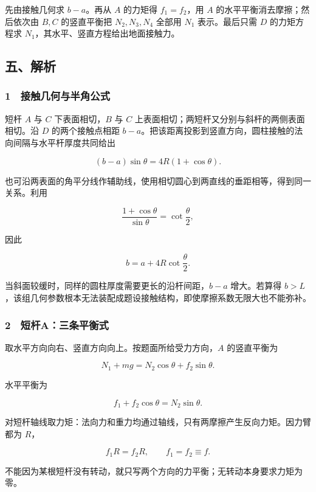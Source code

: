 \documentclass[12pt,a4paper,fontset=fandol]{ctexart}
\begin{document}
先由接触几何求 \(b-a\)。再从 \(A\) 的力矩得 \(f_1=f_2\)，用 \(A\)
的水平平衡消去摩擦；然后依次由 \(B,C\) 的竖直平衡把 \(N_2,N_3,N_4\)
全部用 \(N_1\) 表示。最后只需 \(D\) 的力矩方程求
\(N_1\)，其水平、竖直方程给出地面接触力。

\subsection{五、解析}\label{ux4e94ux89e3ux6790-3}

\subsubsection{1　接触几何与半角公式}\label{ux63a5ux89e6ux51e0ux4f55ux4e0eux534aux89d2ux516cux5f0f}

短杆 \(A\) 与 \(C\) 下表面相切，\(B\) 与 \(C\)
上表面相切；两短杆又分别与斜杆的两侧表面相切。沿 \(D\) 的两个接触点相距
\(b-a\)。把该距离投影到竖直方向，圆柱接触的法向间隔与水平杆厚度共同给出

\[ (b-a)\sin\theta=4R(1+\cos\theta).\]

也可沿两表面的角平分线作辅助线，使用相切圆心到两直线的垂距相等，得到同一关系。利用

\[\frac{1+\cos\theta}{\sin\theta}=\cot\frac\theta2,\]

因此

\[\boxed{b=a+4R\cot\frac\theta2.}\]

当斜面较缓时，同样的圆柱厚度需要更长的沿杆间距，\(b-a\) 增大。若算得
\(b>L\)，该组几何参数根本无法装配成题设接触结构，即使摩擦系数无限大也不能弥补。

\subsubsection{2　短杆A：三条平衡式}\label{ux77edux6746aux4e09ux6761ux5e73ux8861ux5f0f}

取水平方向向右、竖直方向向上。按题面所给受力方向，\(A\) 的竖直平衡为

\[\boxed{N_1+mg=N_2\cos\theta+f_2\sin\theta.}\]

水平平衡为

\[\boxed{f_1+f_2\cos\theta=N_2\sin\theta.}\]

对短杆轴线取力矩：法向力和重力均通过轴线，只有两摩擦产生反向力矩。因力臂都为
\(R\)，

\[f_1R=f_2R,\qquad\boxed{f_1=f_2\equiv f.}\]

不能因为某根短杆没有转动，就只写两个方向的力平衡；无转动本身要求力矩为零。
\end{document}
